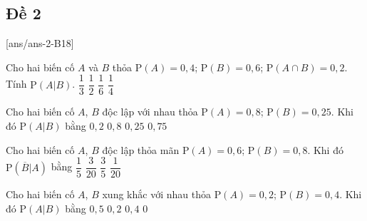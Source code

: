 \subsection{Đề 2}
[ans/ans-2-B18]
\caulc
\begin{ex}%
	Cho hai biến cố $A$ và $B$ thỏa $\mathrm{P}(A)=0{,}4$; $\mathrm{P}(B)=0{,}6$; $\mathrm{P}\left(A\cap B\right)=0{,}2$. Tính $\mathrm{P}\left(A|B\right)$.
	\choice
	{\True $\dfrac{1}{3}$}
	{$\dfrac{1}{2}$}
	{$\dfrac{1}{6}$}
	{$\dfrac{1}{4}$}
\end{ex}	


\begin{ex}%
	Cho hai biến cố $A$, $B$ độc lập với nhau thỏa $\mathrm{P}(A)=0{,}8$; $\mathrm{P}(B)=0{,}25$. Khi đó $\mathrm{P}\left(A|B\right)$ bằng
	\choice
	{$0{,}2$}
	{\True $0{,}8$}
	{$0{,}25$}
	{$0{,}75$}
\end{ex}	


\begin{ex}%
	Cho hai biến cố $A$, $B$ độc lập thỏa mãn $\mathrm{P}(A)=0{,}6$; $\mathrm{P}(B)=0{,}8$. Khi đó $\mathrm{P}\left(\overline{B}|A\right)$ bằng
	\choice
	{\True $\dfrac{1}{5}$}
	{$\dfrac{3}{20}$}
	{$\dfrac{3}{5}$}
	{$\dfrac{1}{20}$}
\end{ex}	



\begin{ex}%
		Cho hai biến cố $A$, $B$ xung khắc với nhau thỏa $\mathrm{P}(A)=0{,}2$; $\mathrm{P}(B)=0{,}4$. Khi đó $\mathrm{P}\left(A|B\right)$ bằng
		\choice
		{$0{,}5$}
		{$0{,}2$}
		{$0{,}4$}
		{\True $0$}
\end{ex}	

